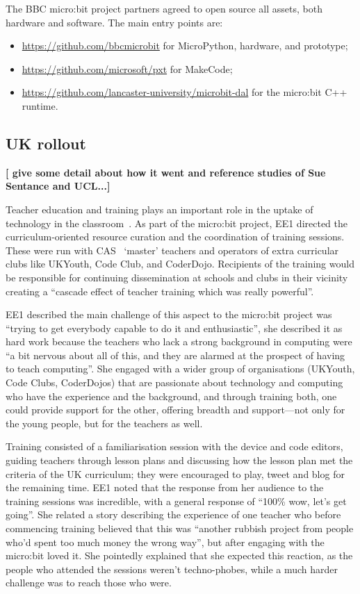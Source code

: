 The BBC micro:bit project partners agreed to open source all assets, both
hardware and software. The main entry points are:
\begin{itemize}
\item \url{https://github.com/bbcmicrobit} for MicroPython, hardware, and prototype;
\item \url{https://github.com/microsoft/pxt} for MakeCode;
\item \url{https://github.com/lancaster-university/microbit-dal} for the micro:bit
C++ runtime.
\end{itemize}


\subsection{UK rollout}

{\bf [ give some detail about how it went and reference studies of Sue Sentance and
UCL...]}

Teacher education and training plays an important role in the uptake of technology in the classroom~\cite{buabeng2012factors}. As part of the micro:bit project, EE1 directed the curriculum-oriented resource curation and the coordination of training sessions. These were run with CAS~\cite{crick2011computing} `master' teachers and operators of extra curricular clubs like UKYouth, Code Club, and CoderDojo. Recipients of the training would be responsible for continuing dissemination at schools and clubs in their vicinity creating a ``cascade effect of teacher training which was really powerful''.

EE1 described the main challenge of this aspect to the micro:bit project was ``trying to get everybody capable to do it and enthusiastic'', she described it as hard work because the teachers who lack a strong background in computing were ``a bit nervous about all of this, and they are alarmed at the prospect of having to teach computing''. She engaged with a wider group of organisations (UKYouth, Code Clubs, CoderDojos) that are passionate about technology and computing who have the experience and the background, and through training both, one could provide support for the other, offering breadth and support---not only for the young people, but for the teachers as well.

Training consisted of a familiarisation session with the device and code editors, guiding teachers through lesson plans and discussing how the lesson plan met the criteria of the UK curriculum; they were encouraged to play, tweet and blog for the remaining time. EE1 noted that the response from her audience to the training sessions was incredible, with a general response of ``100\% wow, let's get going''. She related a story describing the experience of one teacher who before commencing training believed that this was ``another rubbish project from people who'd spent too much money the wrong way'', but after engaging with the micro:bit loved it. She pointedly explained that she expected this reaction, as the people who attended the sessions weren't techno-phobes, while a much harder challenge was to reach those who were.

